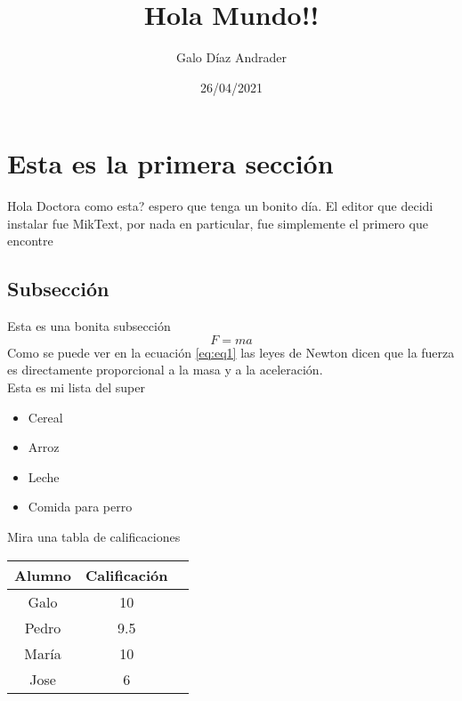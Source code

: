 \documentclass[11pt]{article}
\title{Hola Mundo!!}
\author{Galo Díaz Andrader}
\date{26/04/2021}
\begin{document}
\maketitle

\section{Esta es la primera sección}

Hola Doctora como esta? espero que tenga un bonito día. El editor que decidi instalar fue MikText, por nada en particular, fue simplemente el primero que encontre

\subsection{Subsección}

Esta es una bonita subsección 
\begin{equation}
F= m a
	\label{eq:eq1}
\end{equation}
Como se puede ver en la ecuación \ref{eq:eq1} las leyes de Newton dicen que la fuerza es directamente proporcional a la masa y a la aceleración.\\ 
 Esta es mi lista del super
\begin{itemize}
    \item Cereal
    \item Arroz
    \item Leche
    \item Comida para perro
\end{itemize}
Mira una tabla de calificaciones \\ 

\begin{tabular}{|c|c|c|}
\hline
Alumno & Calificación \\ \hline
Galo & 10 \\
Pedro & 9.5 \\
María & 10 \\
Jose & 6 \\ \hline
\end{tabular}
\end{document}

